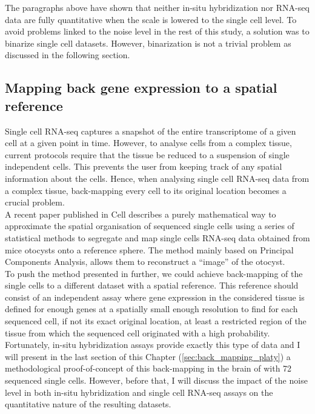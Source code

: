 	The paragraphs above have shown that neither in-situ hybridization nor RNA-seq data are fully quantitative when the scale is lowered to the single cell level. To avoid problems linked to the noise level in the rest of this study, a solution was to binarize single cell datasets. However, binarization is not a trivial problem as discussed in the following section.

  \subsection{Mapping back gene expression to a spatial reference}

	Single cell RNA-seq captures a snapshot of the entire transcriptome of a given cell at a given point in time. However, to analyse cells from a complex tissue, current protocols require that the tissue be reduced to a suspension of single independent cells. This prevents the user from keeping track of any spatial information about the cells. Hence, when analysing single cell RNA-seq data from a complex tissue, back-mapping every cell to its original location becomes a crucial problem.\\ 
	
	A recent paper published in Cell \citep{durruthy14} describes a purely mathematical way to approximate the spatial organisation of sequenced single cells using a series of statistical methods to segregate and map single cells RNA-seq data obtained from mice otocysts onto a reference sphere. The method mainly based on Principal Components Analysis, allows them to reconstruct a ``image'' of the otocyst.\\
	
	To push the method presented in \citep{durruthy14} further, we could achieve back-mapping of the single cells to a different dataset with a spatial reference. This reference should consist of an independent assay where gene expression in the considered tissue is defined for enough genes at a spatially small enough resolution to find for each sequenced cell, if not its exact original location, at least a restricted region of the tissue from which the sequenced cell originated with a high probability.\\
	
	Fortunately, in-situ hybridization assays provide exactly this type of data and I will present in the last section of this Chapter (\ref{sec:back_mapping_platy}) a methodological proof-of-concept of this back-mapping in the brain of \platy{} with 72 sequenced single cells. However, before that, I will discuss the impact of the noise level in both in-situ hybridization and single cell RNA-seq assays on the quantitative nature of the resulting datasets.
	
